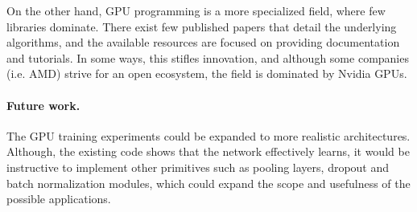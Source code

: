 On the other hand, GPU programming is a more specialized field, where few
libraries dominate. There exist few published papers that detail the underlying algorithms, and the
available resources are focused on providing documentation and tutorials. In some ways, this stifles
innovation, and although some companies (i.e. AMD) strive for an open ecosystem, the field is
dominated by Nvidia GPUs.

\paragraph{Future work.}
The GPU training experiments could be expanded to more realistic architectures. Although, the
existing code shows that the network effectively learns, it would be instructive to implement other
primitives such as pooling layers, dropout and batch normalization modules, which could expand the
scope and usefulness of the possible applications.


